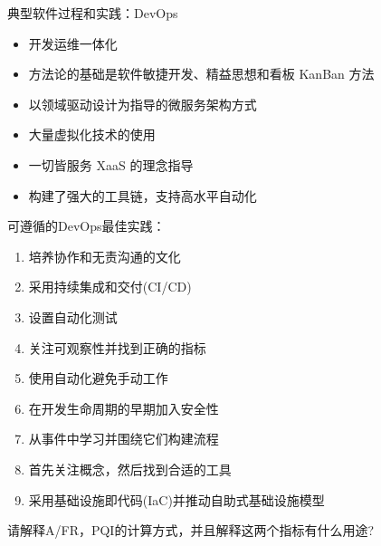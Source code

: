 \begin{solution}
典型软件过程和实践：DevOps
\vspace{-0.8em}
\begin{multicols}{2}
    \begin{itemize}
        \item 开发运维一体化
        \item 方法论的基础是软件敏捷开发、精益思想和看板 KanBan 方法
        \item 以领域驱动设计为指导的微服务架构方式
        \item 大量虚拟化技术的使用
        \item 一切皆服务 XaaS 的理念指导
        \item 构建了强大的工具链，支持高水平自动化
    \end{itemize}
\end{multicols}
\vspace{-1em}

可遵循的DevOps最佳实践：
\vspace{-0.8em}
\begin{multicols}{2}
    \begin{enumerate}[label=\arabic*.]
        \item 培养协作和无责沟通的文化
        \item 采用持续集成和交付(CI/CD)
        \item 设置自动化测试
        \item 关注可观察性并找到正确的指标
        \item 使用自动化避免手动工作
        \item 在开发生命周期的早期加入安全性
        \item 从事件中学习并围绕它们构建流程
        \item 首先关注概念，然后找到合适的工具
        \item 采用基础设施即代码(IaC)并推动自助式基础设施模型
    \end{enumerate}
\end{multicols}
\vspace{-1em}
\end{solution}



\begin{problem}[2013、2015、2018]
请解释A/FR，PQI的计算方式，并且解释这两个指标有什么用途?
\end{problem}


